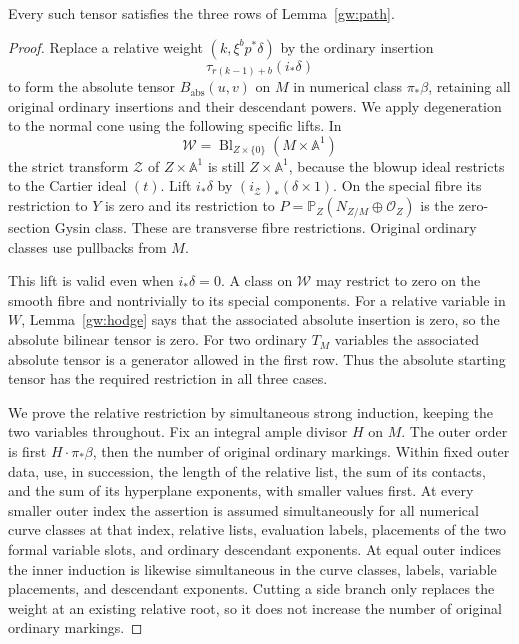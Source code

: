\begin{lemma}\label{gw:relative}
Every such tensor satisfies the three rows of Lemma~\ref{gw:path}.
\end{lemma}
\begin{proof}
Replace a relative weight $(k,\xi^bp^*\delta)$ by the ordinary insertion
\begin{equation}\label{gw:translation}
\tau_{r(k-1)+b}(i_*\delta)
\end{equation}
to form the absolute tensor $B_{\mathrm{abs}}(u,v)$ on $M$ in numerical
class $\pi_*\beta$, retaining all original ordinary insertions
and their descendant powers.  We apply degeneration to the normal cone
using the following specific lifts.  In
\[
 \mathcal W=\operatorname{Bl}_{Z\times\{0\}}
                     (M\times\mathbb A^1)
\]
the strict transform $\mathcal Z$ of $Z\times\mathbb A^1$ is still
$Z\times\mathbb A^1$, because the blowup ideal restricts to the Cartier ideal
$(t)$.  Lift $i_*\delta$ by $(i_{\mathcal Z})_*(\delta\times1)$.
On the special fibre its restriction to $Y$ is zero and its restriction to
$P=\mathbb P_Z(N_{Z/M}\oplus\mathcal O_Z)$ is the zero-section Gysin class.
These are transverse fibre restrictions.  Original ordinary classes use
pullbacks from $M$.

This lift is valid even when $i_*\delta=0$.  A class on $\mathcal W$ may
restrict to zero on the smooth fibre and nontrivially to its special
components.  For a relative variable in $W$, Lemma~\ref{gw:hodge} says that
the associated absolute insertion is zero, so the absolute bilinear tensor
is zero.  For two ordinary $T_M$ variables the associated absolute tensor
is a generator allowed in the first row.  Thus the absolute starting tensor
has the required restriction in all three cases.

We prove the relative restriction by simultaneous strong induction, keeping
the two variables throughout.  Fix an integral ample divisor $H$ on $M$.
The outer order is first $H\cdot\pi_*\beta$, then the number of original
ordinary markings.  Within fixed outer data, use, in succession, the length
of the relative list, the sum of its contacts, and the sum of its
hyperplane exponents, with smaller values first.  At every smaller outer
index the assertion is assumed simultaneously for all numerical curve
classes at that index, relative lists, evaluation labels, placements of
the two formal variable slots, and ordinary descendant exponents.
At equal outer indices the inner induction is likewise simultaneous in
the curve classes, labels, variable placements, and descendant exponents.
Cutting a side branch only replaces the weight
at an existing relative root, so it does not increase the number of original
ordinary markings.


\end{proof}
